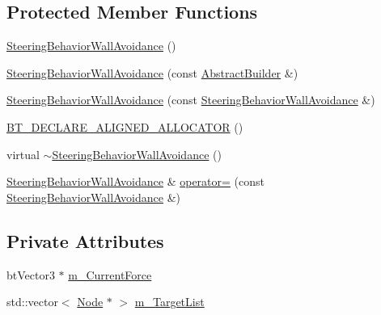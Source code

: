 \subsection*{Protected Member Functions}
\begin{DoxyCompactItemize}
\item 
\mbox{\hyperlink{classnjli_1_1_steering_behavior_wall_avoidance_a6ba7e1aa0e5d8a88e90fb504bc255c28}{Steering\+Behavior\+Wall\+Avoidance}} ()
\item 
\mbox{\hyperlink{classnjli_1_1_steering_behavior_wall_avoidance_acdd632f82a1fb41c8b223edc9f3ec650}{Steering\+Behavior\+Wall\+Avoidance}} (const \mbox{\hyperlink{classnjli_1_1_abstract_builder}{Abstract\+Builder}} \&)
\item 
\mbox{\hyperlink{classnjli_1_1_steering_behavior_wall_avoidance_a816426cb250cd64a44e396e9626c5371}{Steering\+Behavior\+Wall\+Avoidance}} (const \mbox{\hyperlink{classnjli_1_1_steering_behavior_wall_avoidance}{Steering\+Behavior\+Wall\+Avoidance}} \&)
\item 
\mbox{\hyperlink{classnjli_1_1_steering_behavior_wall_avoidance_a4bf956f11a8db11181693d6e77c6df08}{B\+T\+\_\+\+D\+E\+C\+L\+A\+R\+E\+\_\+\+A\+L\+I\+G\+N\+E\+D\+\_\+\+A\+L\+L\+O\+C\+A\+T\+OR}} ()
\item 
virtual \mbox{\hyperlink{classnjli_1_1_steering_behavior_wall_avoidance_a28a2d45db65b347684537f4b2e889563}{$\sim$\+Steering\+Behavior\+Wall\+Avoidance}} ()
\item 
\mbox{\hyperlink{classnjli_1_1_steering_behavior_wall_avoidance}{Steering\+Behavior\+Wall\+Avoidance}} \& \mbox{\hyperlink{classnjli_1_1_steering_behavior_wall_avoidance_ab6800def5ef3a2c5c560e0bb535116f6}{operator=}} (const \mbox{\hyperlink{classnjli_1_1_steering_behavior_wall_avoidance}{Steering\+Behavior\+Wall\+Avoidance}} \&)
\end{DoxyCompactItemize}
\subsection*{Private Attributes}
\begin{DoxyCompactItemize}
\item 
bt\+Vector3 $\ast$ \mbox{\hyperlink{classnjli_1_1_steering_behavior_wall_avoidance_a95c8cb5753a9f8256fd1edf39be296c8}{m\+\_\+\+Current\+Force}}
\item 
std\+::vector$<$ \mbox{\hyperlink{classnjli_1_1_node}{Node}} $\ast$ $>$ \mbox{\hyperlink{classnjli_1_1_steering_behavior_wall_avoidance_ab4d5409727efe6c76c7b19834187f117}{m\+\_\+\+Target\+List}}
\end{DoxyCompactItemize}
